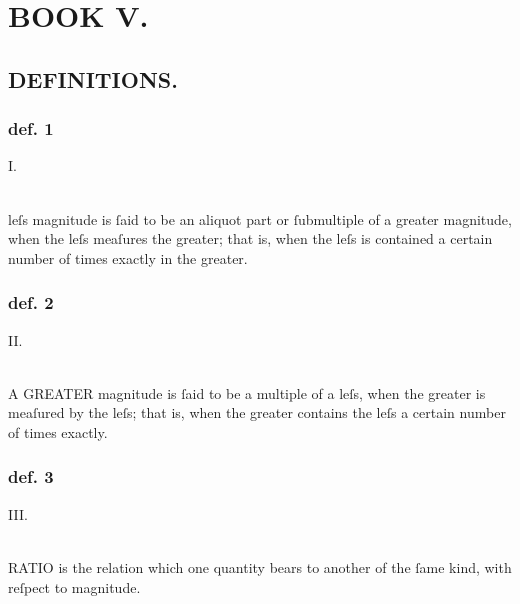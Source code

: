 \pagestyle{fancy}
\fancyhf{}
\renewcommand{\headrulewidth}{0pt}
%

\section[Book V]{\centering BOOK V.}
\label{sec:book5}

\hfill

\subsection[Definitions]{\centering \scshape{\LARGE{DEFINITIONS.}}}
\label{subsec:definitions}

\begin{center}
    \begin{minipage}{0.8\textwidth}
        \subsubsection{def. 1}
        \begin{center}
            I.\label{book5def1}\\
            \hfill\\
            \raggedright \lettrine[lines=3, loversize=1, nindent=0pt]{}{} leſs magnitude is ſaid to be an aliquot part or ſubmultiple of a greater magnitude, when the leſs meaſures the greater; that is, when the leſs is contained a certain number of times exactly in the greater.
        \end{center}
        \subsubsection{def. 2}
        \begin{center}
            II.\label{book5def2}\\
            \hfill\\
            \raggedright A \textsc{GREATER} magnitude is ſaid to be a multiple of a leſs, when the greater is meaſured by the leſs; that is, when the greater contains the leſs a certain number of times exactly.
        \end{center}
        \subsubsection{def. 3}
        \begin{center}
            III.\label{book5def3}\\
            \hfill\\
            \raggedright R\textsc{ATIO} is the relation which one quantity bears to another of the ſame kind, with reſpect to magnitude.
        \end{center}

\end{minipage}
\end{center}
